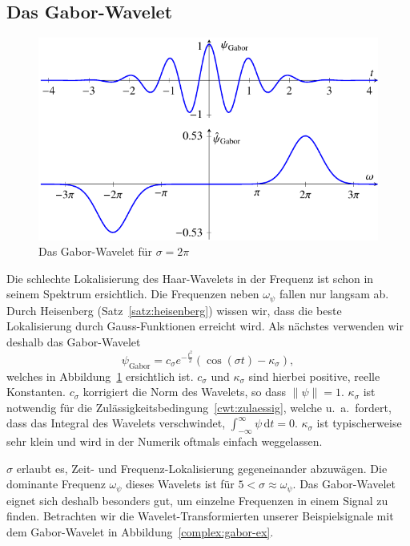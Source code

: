 \subsection{Das Gabor-Wavelet}
\begin{figure}
	\centering
	\includegraphics{papers/complex/images/gabor.pdf}
	\caption{Das Gabor-Wavelet für $\sigma = 2\pi$ \label{complex:gabor}}
\end{figure}

Die schlechte Lokalisierung des Haar-Wavelets in der Frequenz ist schon in seinem Spektrum ersichtlich.
Die Frequenzen neben $\omega_\psi$ fallen nur langsam ab.
Durch Heisenberg (Satz~\ref{satz:heisenberg}) wissen wir, dass die beste Lokalisierung durch Gauss-Funktionen erreicht wird.
Als nächstes verwenden wir deshalb das Gabor-Wavelet
\[
	\psi_\text{Gabor} = c_\sigma e^{-\frac{t^2}{2}}\left(\cos\left(\sigma t\right) - \kappa_\sigma\right),
\]
welches in Abbildung~\ref{complex:gabor} ersichtlich ist.
$c_\sigma$ und $\kappa_\sigma$ sind hierbei positive, reelle Konstanten.
$c_\sigma$ korrigiert die Norm des Wavelets, so dass $\|\psi\| = 1$.
$\kappa_\sigma$ ist notwendig für die Zulässigkeitsbedingung~\eqref{cwt:zulaessig}, welche u.~a.~fordert, dass das Integral des Wavelets verschwindet,  $\int_{-\infty}^{\infty}\psi\,\mathrm{d}t = 0$.
$\kappa_\sigma$ ist typischerweise sehr klein und wird in der Numerik oftmals einfach weggelassen.

$\sigma$ erlaubt es, Zeit- und Frequenz-Lokalisierung gegeneinander abzuwägen.
Die dominante Frequenz $\omega_\psi$ dieses Wavelets ist für $5 < \sigma \approx \omega_\psi$.
Das Gabor-Wavelet eignet sich deshalb besonders gut, um einzelne Frequenzen in einem Signal zu finden.
Betrachten wir die Wavelet-Transformierten unserer Beispielsignale mit dem Gabor-Wavelet in Abbildung~\ref{complex:gabor-ex}.

